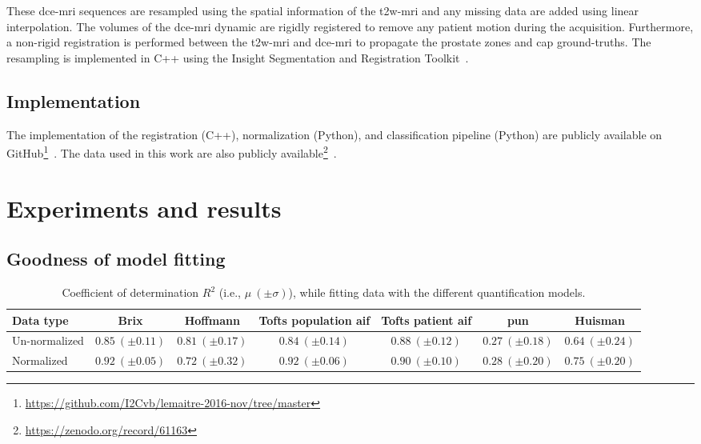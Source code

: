These \ac{dce}-\ac{mri} sequences are resampled using the spatial
information of the \ac{t2w}-\ac{mri} and any missing data are added using linear interpolation.
The volumes of the \ac{dce}-\ac{mri} dynamic are rigidly registered to remove any patient motion during the acquisition.
Furthermore, a non-rigid registration is performed between the \ac{t2w}-\ac{mri} and \ac{dce}-\ac{mri} to propagate the prostate zones and \ac{cap} ground-truths.
The resampling is implemented in C++ using the Insight Segmentation and Registration Toolkit~\cite{ibanez2005itk}.

\subsection{Implementation}

The implementation of the registration (C++), normalization (Python), and classification pipeline (Python) are publicly available on GitHub\footnote{\url{https://github.com/I2Cvb/lemaitre-2016-nov/tree/master}}~\cite{lemaitre2016github}.
The data used in this work are also publicly available\footnote{\url{https://zenodo.org/record/61163}}~\cite{lemaitre2016dce}.

\section{Experiments and results}\label{sec:experiments}

\subsection{Goodness of model fitting}\label{sec:fit}


\begin{table}
  \caption{Coefficient of determination $R^{2}$ (i.e., $\mu \ (\pm \sigma)$), while fitting data with the different quantification models.}
  \centering
  \begin{tabular}{lc c c c c c}
    \toprule
    Data type & Brix & Hoffmann & Tofts population \ac{aif} & Tofts patient \ac{aif} & \ac{pun} & Huisman \\
    \midrule
    Un-normalized & $0.85 \ (\pm 0.11)$ & $0.81 \ (\pm 0.17)$ & $0.84 \ (\pm 0.14)$ & $0.88 \ (\pm 0.12)$ & $0.27 \ (\pm 0.18)$ & $0.64 \ (\pm 0.24)$  \\
    Normalized    & $0.92 \ (\pm 0.05)$ & $0.72 \ (\pm 0.32)$ & $0.92 \ (\pm 0.06)$ & $0.90 \ (\pm 0.10)$ & $0.28 \ (\pm 0.20)$ & $0.75 \ (\pm 0.20)$  \\
    \bottomrule
  \end{tabular}
  \label{tab:r2}
\end{table}


